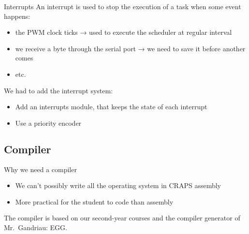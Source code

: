 \documentclass{beamer}
\begin{document}
      \begin{frame}{Interrupts}
        An interrupt is used to stop the execution of a task when some event
        happens:
        \begin{itemize}
          \item the PWM clock ticks → used to execute the scheduler at regular
            interval
          \item we receive a byte through the serial port → we need to save it
            before another comes
          \item etc.
        \end{itemize}

        \pause

        We had to add the interrupt system:
        \begin{itemize}
          \item Add an interrupts module, that keeps the state of each interrupt
          \item Use a priority encoder
        \end{itemize}
      \end{frame}

    \subsection{Compiler}
      \begin{frame}{Why we need a compiler}
        \begin{figure}
          \centering
        \end{figure}

        \begin{itemize}
          \item We can't possibly write all the operating system in CRAPS
            assembly
          \item More practical for the student to code than assembly
        \end{itemize}

        The compiler is based on our second-year courses and the compiler
        generator of Mr.\ Gandriau: EGG.
      \end{frame}
\end{document}
